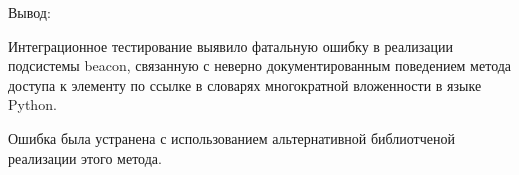\documentclass[a4paper,12pt]{report}
\numberwithin{equation}{section}
\begin{document}
Вывод:


Интеграционное тестирование выявило фатальную ошибку в реализации подсистемы beacon, связанную с неверно документированным
поведением метода доступа к элементу по ссылке в словарях многократной вложенности в языке Python.


Ошибка была устранена с использованием альтернативной библиотченой реализации этого метода.
\end{document}
